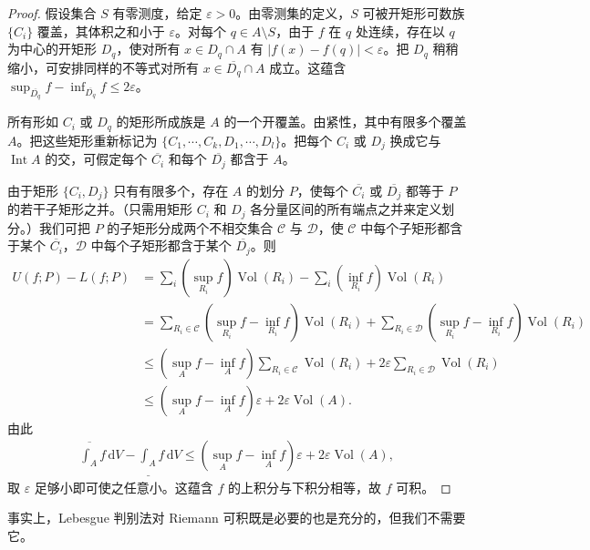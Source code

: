 \documentclass[../../main.tex]{subfiles}
\begin{document}
\begin{proof}
假设集合 $S$ 有零测度，给定 $\varepsilon>0$。由零测集的定义，$S$ 可被开矩形可数族 $\{C_i\}$ 覆盖，其体积之和小于 $\varepsilon$。对每个 $q\in A\setminus S$，由于 $f$ 在 $q$ 处连续，存在以 $q$ 为中心的开矩形 $D_q$，使对所有 $x\in D_q\cap A$ 有 $|f(x)-f(q)|<\varepsilon$。把 $D_q$ 稍稍缩小，可安排同样的不等式对所有 $x\in\overline{D_q}\cap A$ 成立。这蕴含 $\sup_{\overline{D_q}}f-\inf_{\overline{D_q}}f\leqslant2\varepsilon$。

所有形如 $C_i$ 或 $D_q$ 的矩形所成族是 $A$ 的一个开覆盖。由紧性，其中有限多个覆盖 $A$。把这些矩形重新标记为 $\{C_1,\cdots ,C_k,D_1,\cdots ,D_l\}$。把每个 $C_i$ 或 $D_j$ 换成它与 $\operatorname{Int}A$ 的交，可假定每个 $\overline{C_i}$ 和每个 $\overline{D_j}$ 都含于 $A$。

由于矩形 $\{C_i,D_j\}$ 只有有限多个，存在 $A$ 的划分 $P$，使每个 $\overline{C_i}$ 或 $\overline{D_j}$ 都等于 $P$ 的若干子矩形之并。（只需用矩形 $C_i$ 和 $D_j$ 各分量区间的所有端点之并来定义划分。）我们可把 $P$ 的子矩形分成两个不相交集合 $\mathcal C$ 与 $\mathcal D$，使 $\mathcal C$ 中每个子矩形都含于某个 $\overline{C_i}$，$\mathcal D$ 中每个子矩形都含于某个 $\overline{D_j}$。则
\begin{align*}
U(f;P)-L(f;P)
&=\sum_i\left(\sup_{R_i}f\right)\operatorname{Vol}(R_i)-\sum_i\left(\inf_{R_i}f\right)\operatorname{Vol}(R_i)\\
&=\sum_{R_i\in\mathcal C}\left(\sup_{R_i}f-\inf_{R_i}f\right)\operatorname{Vol}(R_i)
+\sum_{R_i\in\mathcal D}\left(\sup_{R_i}f-\inf_{R_i}f\right)\operatorname{Vol}(R_i)\\
&\leqslant\left(\sup_A f-\inf_A f\right)\sum_{R_i\in\mathcal C}\operatorname{Vol}(R_i)
+2\varepsilon\sum_{R_i\in\mathcal D}\operatorname{Vol}(R_i)\\
&\leqslant\left(\sup_A f-\inf_A f\right)\varepsilon+2\varepsilon\operatorname{Vol}(A).
\end{align*}
由此
\begin{align*}
\overline{\int_A}f\,\mathrm{d}V-\underline{\int_A}f\,\mathrm{d}V
\leqslant\left(\sup_A f-\inf_A f\right)\varepsilon+2\varepsilon\operatorname{Vol}(A),
\end{align*}
取 $\varepsilon$ 足够小即可使之任意小。这蕴含 $f$ 的上积分与下积分相等，故 $f$ 可积。
\end{proof}

事实上，Lebesgue 判别法对 Riemann 可积既是必要的也是充分的，但我们不需要它。
\end{document}
